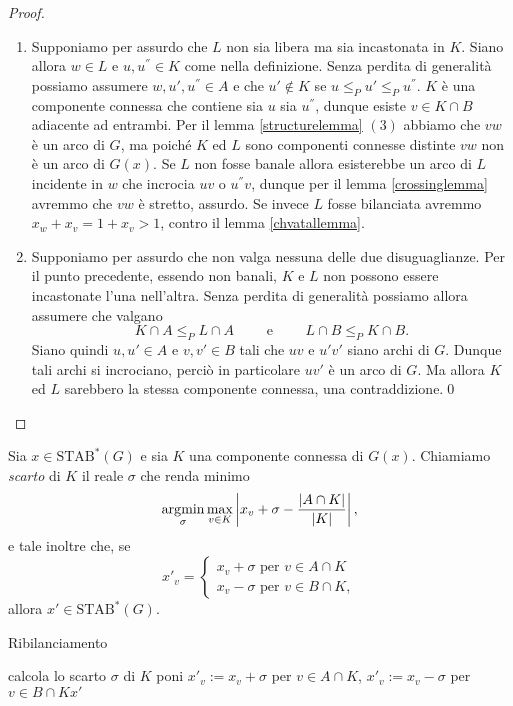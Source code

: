 \begin{proof}
	\begin{enumerate}
		\item Supponiamo per assurdo che \(L\) non sia libera ma sia incastonata in \(K\). Siano allora \(w\in L\) e \(u,u^{''}\in K\) come nella definizione. Senza perdita di generalità possiamo assumere \(w,u',u^{''}\in A\) e che \(u'\not\in K\) se \(u\le_{P}u'\le_{P}u^{''}\). \(K\) \`e una componente connessa che contiene sia \(u\) sia \(u^{''}\), dunque esiste \(v\in K\cap B\) adiacente ad entrambi. Per il lemma \ref{structurelemma} \((3)\) abbiamo che \(vw\) \`e un arco di \(G\), ma poich\'e \(K\) ed \(L\) sono componenti connesse distinte \(vw\) non \`e un arco di \(G(x)\). Se \(L\) non fosse banale allora esisterebbe un arco di \(L\) incidente in \(w\) che incrocia \(uv\) o \(u^{''}v\), dunque per il lemma \ref{crossinglemma} avremmo che \(vw\) \`e stretto, assurdo. Se invece \(L\) fosse bilanciata avremmo \(x_w+x_v=1+x_v>1\), contro il lemma \ref{chvatallemma}. 
		\item Supponiamo per assurdo che non valga nessuna delle due disuguaglianze. Per il punto precedente, essendo non banali, \(K\) e \(L\) non possono essere incastonate l'una nell'altra. Senza perdita di generalità possiamo allora assumere che valgano
		\[K\cap A\le_{P}L\cap A\qquad\text{ e }\qquad L\cap B\le_{P}K\cap B.\]
		Siano quindi \(u,u'\in A\) e \(v,v'\in B\) tali che \(uv\) e \(u'v'\) siano archi di \(G\). Dunque tali archi si incrociano, perciò in particolare \(uv'\) è un arco di \(G\). Ma allora \(K\) ed \(L\) sarebbero la stessa componente connessa, una contraddizione.\qed 
	\end{enumerate}
\end{proof}
\begin{definition}
	Sia \(x\in \text{STAB}^*(G)\) e sia \(K\) una componente connessa di \(G(x)\). Chiamiamo \emph{scarto} di \(K\) il reale \(\sigma\) che renda minimo
	\[\operatorname*{\arg\!\min}_{\sigma}\max_{v\in K}\left|x_v+\sigma-\frac{|A\cap K|}{|K|}\right|,\]
	e tale inoltre che, se
	\[ x'_v = 
	\begin{cases}
		x_v + \sigma \text{ per } v\in A\cap K\\
		x_v - \sigma \text{ per } v\in B\cap K, 
	\end{cases}
	\]
	allora \(x'\in \text{STAB}^*(G)\).
\end{definition}
\begin{algorithm}
	\caption{Ribilanciamento} \label{rebalance} 
	\begin{algorithmic}
		[1]  
		\STATE calcola lo scarto \(\sigma\) di \(K\)
		\STATE poni \(x'_v := x_v+\sigma\) per \(v\in A\cap K\), \(x'_v := x_v-\sigma\) per \(v\in B\cap K\)\ENDWHILE \RETURN \(x'\) 
	\end{algorithmic}
\end{algorithm}

